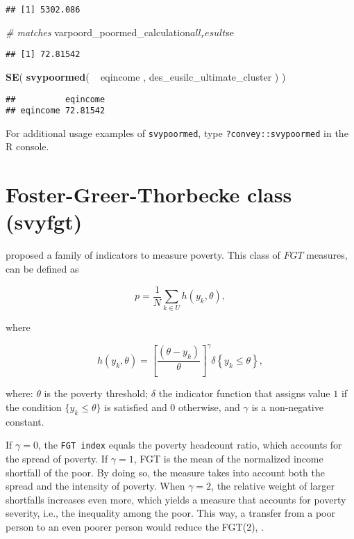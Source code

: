\documentclass[]{book}
\newenvironment{Shaded}{\begin{snugshade}}{\end{snugshade}}
\newcommand{\KeywordTok}[1]{\textcolor[rgb]{0.13,0.29,0.53}{\textbf{{#1}}}}
\newcommand{\StringTok}[1]{\textcolor[rgb]{0.31,0.60,0.02}{{#1}}}
\newcommand{\CommentTok}[1]{\textcolor[rgb]{0.56,0.35,0.01}{\textit{{#1}}}}
\newcommand{\NormalTok}[1]{{#1}}
\theoremstyle{definition}
\theoremstyle{definition}
\theoremstyle{remark}
\begin{document}
\begin{verbatim}
## [1] 5302.086
\end{verbatim}

\begin{Shaded}
\begin{Highlighting}[]
\CommentTok{# matches}
\NormalTok{varpoord_poormed_calculation$all_result$se}
\end{Highlighting}
\end{Shaded}

\begin{verbatim}
## [1] 72.81542
\end{verbatim}

\begin{Shaded}
\begin{Highlighting}[]
\KeywordTok{SE}\NormalTok{( }\KeywordTok{svypoormed}\NormalTok{( ~}\StringTok{ }\NormalTok{eqincome , des_eusilc_ultimate_cluster ) )}
\end{Highlighting}
\end{Shaded}

\begin{verbatim}
##          eqincome
## eqincome 72.81542
\end{verbatim}

For additional usage examples of \texttt{svypoormed}, type
\texttt{?convey::svypoormed} in the R console.

\section{Foster-Greer-Thorbecke class
(svyfgt)}\label{foster-greer-thorbecke-class-svyfgt}

\citep{foster1984} proposed a family of indicators to measure poverty.
This class of \(FGT\) measures, can be defined as

\[
p=\frac{1}{N}\sum_{k\in U}h(y_{k},\theta ), 
\]

where

\[
h(y_{k},\theta )=\left[ \frac{(\theta -y_{k})}{\theta }\right] ^{\gamma
}\delta \left\{ y_{k}\leq \theta \right\} , 
\]

where: \(\theta\) is the poverty threshold; \(\delta\) the indicator
function that assigns value \(1\) if the condition
\(\{y_{k}\leq \theta \}\) is satisfied and \(0\) otherwise, and
\(\gamma\) is a non-negative constant.

If \(\gamma =0\), the \texttt{FGT\ index} equals the poverty headcount
ratio, which accounts for the spread of poverty. If \(\gamma =1\), FGT
is the mean of the normalized income shortfall of the poor. By doing so,
the measure takes into account both the spread and the intensity of
poverty. When \(\gamma =2\), the relative weight of larger shortfalls
increases even more, which yields a measure that accounts for poverty
severity, i.e., the inequality among the poor. This way, a transfer from
a poor person to an even poorer person would reduce the FGT(2),
\citep{foster1984}.
\end{document}
